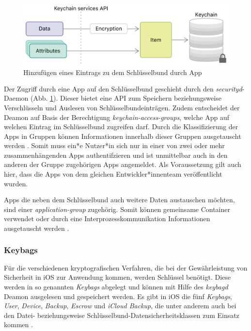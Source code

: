 \begin{figure}[h]
	\centering
  		\includegraphics[width=1\textwidth]{../images/keychain-api-example}
		\caption{Hinzufügen eines Eintrags zu dem Schlüsselbund durch App \cite{apple2020keychain_items}}
		\label{fig:add-entry-to-keychain}
\end{figure}

Der Zugriff durch eine App auf den Schlüsselbund geschieht durch den
\textit{securityd}-Daemon (Abb. \ref{fig:add-entry-to-keychain}). Dieser bietet
eine API zum Speichern beziehungsweise Verschlüsseln und Auslesen von
Schlüsselbundeinträgen. Zudem  entscheidet der Deamon auf Basis der Berechtigung
\textit{keychain-access-groups}, welche App auf welchen Eintrag im Schlüsselbund
zugreifen darf. Durch die Klassifizierung der Apps in Gruppen können
Informationen innerhalb dieser Gruppen ausgetauscht werden
\cite{apple2020keychain_item_groups}. Somit muss ein*e Nutzer*in sich nur in
einer von zwei oder mehr zusammenhängenden Apps authentifzieren und ist
unmittelbar auch in den anderen der Gruppe zugehörigen Apps angemeldet. Als
Voraussetzung gilt auch hier, dass die Apps von dem gleichen
Entwickler*innenteam veröffentlicht wurden.

Apps die neben dem Schlüsselbund auch weitere Daten austauschen möchten, sind
einer \textit{application-group} zugehörig.  Somit können gemeinsame Container
verwendet oder durch eine Interprozesskommunikation Informationen ausgetauscht
werden \cite{apple2020keychain_application_groups}. 

\subsubsection{Keybags}
Für die verschiedenen kryptografischen Verfahren, die bei der Gewährleistung von Sicherheit in iOS zur Anwendung kommen, werden Schlüssel benötigt. Diese werden in so genannten \textit{Keybags}
abgelegt und können mit Hilfe des \textit{keybagd} Deamon ausgelesen und
gespeichert werden.  Es gibt in iOS die fünf \textit{Keybags}, \textit{User},
\textit{Device}, \textit{Backup}, \textit{Escrow} und \textit{iCloud Backup},
die unter anderem auch bei den Datei- beziehungsweise
Schlüsselbund-Datensicherheitsklassen zum Einsatz kommen \cite{apple2020}.

